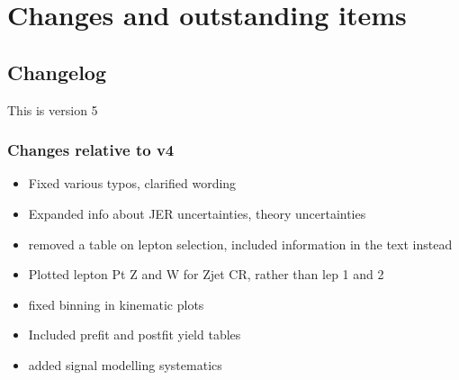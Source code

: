 \documentclass[NOTE, atlasdraft=true, texlive=2016, UKenglish]{\ATLASLATEXPATH atlasdoc}
\begin{document}
\maketitle

\tableofcontents

\clearpage

\section{Changes and outstanding items}
\label{sec:changes}

\subsection{Changelog}

This is version 5

\subsubsection{Changes relative to v4}
\begin{itemize}
  \item Fixed various typos, clarified wording
  \item Expanded info about JER uncertainties, theory uncertainties
  \item removed a table on lepton selection, included information in the text instead
  \item Plotted lepton Pt Z and W for Zjet CR, rather than lep 1 and 2
  \item fixed binning in kinematic plots
  \item Included prefit and postfit yield tables
  \item added signal modelling systematics
\end{itemize}
\end{document}
